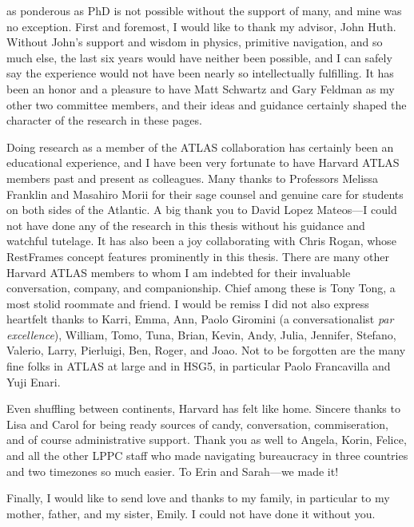 
 as ponderous as PhD is not possible without the support of many, and mine was no exception.  First and foremost, I would like to thank my advisor, John Huth.  Without John's support and wisdom in physics, primitive navigation, and so much else, the last six years would have neither been possible, and I can safely say the experience would not have been nearly so intellectually fulfilling.  It has been an honor and a pleasure to have Matt Schwartz and Gary Feldman as my other two committee members, and their ideas and guidance certainly shaped the character of the research in these pages.

Doing research as a member of the ATLAS collaboration has certainly been an educational experience, and I have been very fortunate to have Harvard ATLAS members past and present as colleagues.  Many thanks to Professors Melissa Franklin and Masahiro Morii for their sage counsel and genuine care for students on both sides of the Atlantic.  A big thank you to David Lopez Mateos---I could not have done any of the research in this thesis without his guidance and watchful tutelage.  It has also been a joy collaborating with Chris Rogan, whose RestFrames concept features prominently in this thesis.  There are many other Harvard ATLAS members to whom I am indebted for their invaluable conversation, company, and companionship.  Chief among these is Tony Tong, a most stolid roommate and friend.  I would be remiss I did not also express heartfelt thanks to Karri, Emma, Ann, Paolo Giromini (a conversationalist \emph{par excellence}), William, Tomo, Tuna, Brian, Kevin, Andy, Julia, Jennifer, Stefano, Valerio, Larry, Pierluigi, Ben, Roger, and Joao.  Not to be forgotten are the many fine folks in ATLAS at large and in HSG5, in particular Paolo Francavilla and Yuji Enari.

Even shuffling between continents, Harvard has felt like home.  Sincere thanks to Lisa and Carol for being ready sources of candy, conversation, commiseration, and of course administrative support.  Thank you as well to Angela, Korin, Felice, and all the other LPPC staff who made navigating bureaucracy in three countries and two timezones so much easier.  To Erin and Sarah---we made it!

Finally, I would like to send love and thanks to my family, in particular to my mother, father, and my sister, Emily.  I could not have done it without you.
